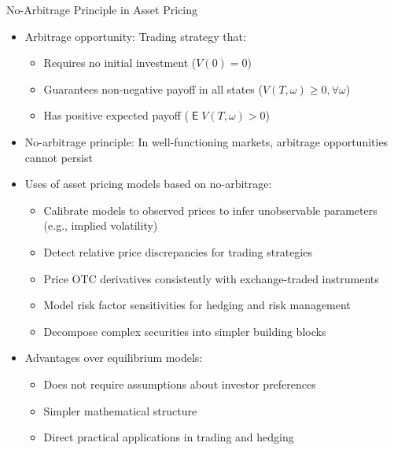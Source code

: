 \documentclass[10pt]{beamer}
\DeclareMathOperator\expc{\mathsf{E}}
\begin{document}
\begin{frame}{No-Arbitrage Principle in Asset Pricing}
  \begin{itemize}[<+->]
    \item Arbitrage opportunity: Trading strategy that:
      \begin{itemize}
        \item Requires no initial investment ($V(0) = 0$)
        \item Guarantees non-negative payoff in all states ($V(T,\omega) \geqslant 0, \forall \omega$)
        \item Has positive expected payoff ($\expc{V(T,\omega)} > 0$)
      \end{itemize}
      
    \item No-arbitrage principle: In well-functioning markets, arbitrage opportunities cannot persist
    
    \item Uses of asset pricing models based on no-arbitrage:
      \begin{itemize}
        \item Calibrate models to observed prices to infer unobservable parameters (e.g., implied volatility)
        \item Detect relative price discrepancies for trading strategies
        \item Price OTC derivatives consistently with exchange-traded instruments
        \item Model risk factor sensitivities for hedging and risk management
        \item Decompose complex securities into simpler building blocks
      \end{itemize}
      
    \item Advantages over equilibrium models:
      \begin{itemize}
        \item Does not require assumptions about investor preferences
        \item Simpler mathematical structure
        \item Direct practical applications in trading and hedging
      \end{itemize}
  \end{itemize}
\end{frame}
\end{document}
